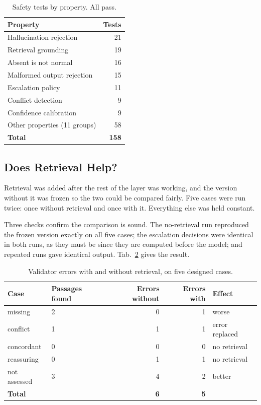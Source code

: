 \begin{table}[H]
  \centering
  \small
  \begin{tabular}{lr}
    \toprule
    \textbf{Property} & \textbf{Tests} \\
    \midrule
    Hallucination rejection      & 21 \\
    Retrieval grounding          & 19 \\
    Absent is not normal         & 16 \\
    Malformed output rejection   & 15 \\
    Escalation policy            & 11 \\
    Conflict detection           & 9 \\
    Confidence calibration       & 9 \\
    Other properties (11 groups) & 58 \\
    \midrule
    \textbf{Total}               & \textbf{158} \\
    \bottomrule
  \end{tabular}
  \caption{Safety tests by property. All pass.}
  \label{tab:safetytests}
\end{table}

\subsection{Does Retrieval Help?}
\label{subsec:reasoning-ab}

Retrieval was added after the rest of the layer was working, and the version without it was
frozen so the two could be compared fairly. Five cases were run twice: once without
retrieval and once with it. Everything else was held constant.

Three checks confirm the comparison is sound. The no-retrieval run reproduced the frozen
version exactly on all five cases; the escalation decisions were identical in both runs, as
they must be since they are computed before the model; and repeated runs gave identical
output. Tab.~\ref{tab:ab} gives the result.

\begin{table}[H]
  \centering
  \small
  \begin{tabular}{llrrl}
    \toprule
    \textbf{Case} & \textbf{Passages found} & \textbf{Errors without} &
    \textbf{Errors with} & \textbf{Effect} \\
    \midrule
    missing      & 2 & 0 & 1 & worse \\
    conflict     & 1 & 1 & 1 & error replaced \\
    concordant   & 0 & 0 & 0 & no retrieval \\
    reassuring   & 0 & 1 & 1 & no retrieval \\
    not assessed & 3 & 4 & 2 & better \\
    \midrule
    \textbf{Total} & & \textbf{6} & \textbf{5} & \\
    \bottomrule
  \end{tabular}
  \caption{Validator errors with and without retrieval, on five designed cases.}
  \label{tab:ab}
\end{table}

